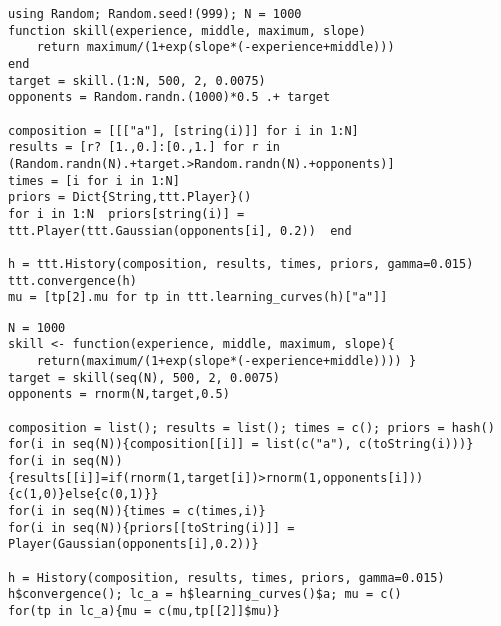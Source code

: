 \documentclass[article]{jss}
\newif\ifen
\newif\ifes
\newcommand{\en}[1]{\ifen#1\fi}
\newcommand{\es}[1]{\ifes#1\fi}
\begin{document}
\en{We attach the \proglang{Julia} and \proglang{R} codes that solve the example presented in the section \ref{sec:skill_evolution} about estimation the skill evolution of a new player.}
\es{Adjuntamos los códigos de \proglang{Julia} y \proglang{R} que resuelven el ejemplo presentado en la sección \ref{sec:skill_evolution} sobre la evolución de habilidad de un jugador nuevo.}
%
\begin{lstlisting}[backgroundcolor=\color{julia},caption={\en{\proglang{Julia} code}\es{Código \proglang{Julia}}},aboveskip=0.0 \baselineskip, belowskip=0.1cm]
using Random; Random.seed!(999); N = 1000
function skill(experience, middle, maximum, slope)
    return maximum/(1+exp(slope*(-experience+middle))) 
end
target = skill.(1:N, 500, 2, 0.0075)
opponents = Random.randn.(1000)*0.5 .+ target

composition = [[["a"], [string(i)]] for i in 1:N]
results = [r? [1.,0.]:[0.,1.] for r in (Random.randn(N).+target.>Random.randn(N).+opponents)]
times = [i for i in 1:N]
priors = Dict{String,ttt.Player}()
for i in 1:N  priors[string(i)] = ttt.Player(ttt.Gaussian(opponents[i], 0.2))  end

h = ttt.History(composition, results, times, priors, gamma=0.015)
ttt.convergence(h)
mu = [tp[2].mu for tp in ttt.learning_curves(h)["a"]]
\end{lstlisting}
%
\begin{lstlisting}[backgroundcolor=\color{r},caption={\en{\proglang{R} code}\es{Código \proglang{R}}},aboveskip=0.0 \baselineskip, belowskip=0.1cm]
N = 1000
skill <- function(experience, middle, maximum, slope){
    return(maximum/(1+exp(slope*(-experience+middle)))) }
target = skill(seq(N), 500, 2, 0.0075)
opponents = rnorm(N,target,0.5)

composition = list(); results = list(); times = c(); priors = hash()
for(i in seq(N)){composition[[i]] = list(c("a"), c(toString(i)))}
for(i in seq(N)){results[[i]]=if(rnorm(1,target[i])>rnorm(1,opponents[i])){c(1,0)}else{c(0,1)}}
for(i in seq(N)){times = c(times,i)}
for(i in seq(N)){priors[[toString(i)]] = Player(Gaussian(opponents[i],0.2))}
    
h = History(composition, results, times, priors, gamma=0.015)
h$convergence(); lc_a = h$learning_curves()$a; mu = c()
for(tp in lc_a){mu = c(mu,tp[[2]]$mu)}
\end{lstlisting}
\end{document}
